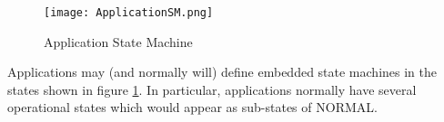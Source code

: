 \begin{figure}[ht]
 \centering
 \texttt{[image: ApplicationSM.png]}
 \caption{Application State Machine}
 \label{fig:ApplicationSM}
\end{figure}

Applications may (and normally will) define embedded state machines in the states shown in figure \ref{fig:ApplicationSM}. In particular, applications normally have several operational states which would appear as sub-states of NORMAL.
